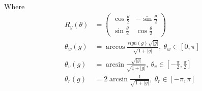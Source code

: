 Where
\begin{equation*}
  \begin{split}
    R_y(\theta) & = \begin{pmatrix}
      \cos{\frac{\theta}{2}} & -\sin{\frac{\theta}{2}} \\
      \sin{\frac{\theta}{2}} & \cos{\frac{\theta}{2}} 
    \end{pmatrix} \\
    \theta_w(g) & = \arccos{\frac{sign(g)\sqrt{|g|}}{\sqrt{1+|g|}}},\ \theta_w \in [0, \pi] \\
    \theta_v(g) & = \arcsin{\frac{\sqrt{|g|}}{\sqrt{1+|g|}}},\ \theta_v \in [-\frac{\pi}{2}, \frac{\pi}{2}] \\
    \theta_r(g) & = 2\arcsin{\frac{1}{\sqrt{1+|g|}}},\ \theta_r \in [-\pi, \pi] 
  \end{split}
\end{equation*}

